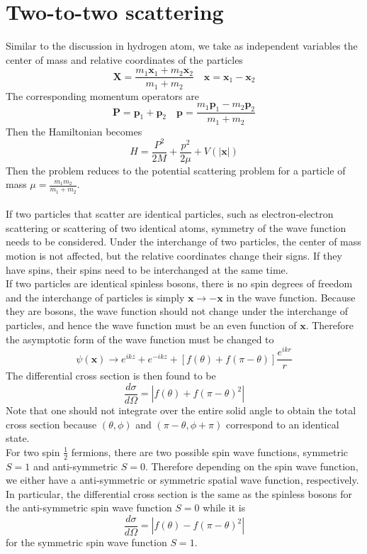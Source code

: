 \section{Two-to-two scattering}
Similar to the discussion in hydrogen atom, we take as independent variables the center of mass and relative coordinates of the particles
\[\bm{X} = \frac{m_1\bm{x}_1 + m_2\bm{x}_2}{m_1+m_2} \quad \bm{x} = \bm{x}_1-\bm{x}_2\]
The corresponding momentum operators are
\[\bm{P} = \bm{p}_1 + \bm{p}_2 \quad \bm{p} = \frac{m_1\bm{p}_1-m_2\bm{p}_2}{m_1 + m_2}\]
Then the Hamiltonian becomes
\[H = \frac{P^2}{2M} + \frac{p^2}{2\mu} + V(|\bm{x}|)\]
Then the problem reduces to the potential scattering problem for a particle of mass $\mu = \frac{m_1m_2}{m_1+m_2}$.
\\ \\
If two particles that scatter are identical particles, such as electron-electron scattering or scattering of two identical atoms, symmetry of the wave function needs to be considered.
Under the interchange of two particles, the center of mass motion is not affected, but the relative coordinates change their signs. If they have spins, their spins need to be interchanged at the same time.
\\
If two particles are identical spinless bosons, there is no spin degrees of freedom and the interchange of particles is simply $\bm{x} \to -\bm{x}$ in the wave function. 
Because they are bosons, the wave function should not change under the interchange of particles, and hence the wave function must be an even function of $\bm{x}$. 
Therefore the asymptotic form of the wave function must be changed to
\[\psi(\bm{x}) \to e^{ikz} + e^{-ikz} + [f(\theta) + f(\pi - \theta)] \frac{e^{ikr}}{r}\]
The differential cross section is then found to be
\[\frac{d\sigma}{d\Omega} = |f(\theta)+f(\pi-\theta)^2|\]
Note that one should not integrate over the entire solid angle to obtain the total cross section because $(\theta,\phi)$ and $(\pi - \theta,\phi+\pi)$ correspond to an identical state.
\\
For two spin $\frac{1}{2}$ fermions, there are two possible spin wave functions, symmetric $S = 1$ and anti-symmetric $S = 0$.
Therefore depending on the spin wave function, we either have a anti-symmetric or symmetric spatial wave function, respectively. In particular, the differential cross section is the same as the spinless bosons for the anti-symmetric spin wave function $S= 0 $ while it is
\[\frac{d\sigma}{d\Omega} = |f(\theta) - f(\pi-\theta)^2|\]
for the symmetric spin wave function $S = 1$.

